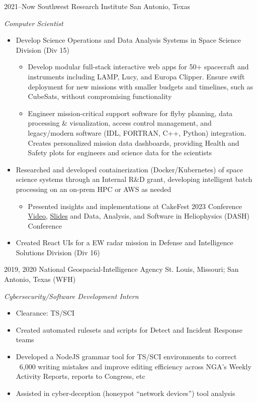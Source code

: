 \documentclass[]{friggeri-cv} %
\begin{document}
\begin{entrylist}

\entry
{2021--Now}
{Southwest Research Institute}
{San Antonio, Texas}
{\emph{Computer Scientist}
	\begin{itemize}
		\item Develop Science Operations and Data Analysis Systems in Space Science Division (Div 15)
		\begin{itemize}
			\item Develop modular full-stack interactive web apps for 50+ spacecraft and instruments including LAMP, Lucy, and Europa Clipper. Ensure swift deployment for new missions with smaller budgets and timelines, such as CubeSats, without compromising functionality
			\item Engineer mission-critical support software for flyby planning, data processing \& visualization, access control management, and legacy/modern software (IDL, FORTRAN, C++, Python) integration. Creates personalized mission data dashboards, providing Health and Safety plots for engineers and science data for the scientists
		\end{itemize}
		\item Researched and developed containerization (Docker/Kubernetes) of space science systems through an Internal R\&D grant, developing intelligent batch processing on an on-prem HPC or AWS as needed
		\begin{itemize}
			\item Presented insights and implementations at CakeFest 2023 Conference  \href{https://www.youtube.com/live/4KB92R7UQc8?si=sA3sVMHHHfgKZKgp&t=19699}{Video}, \href{https://umer936.com/cakefest-2023}{Slides} and Data, Analysis, and Software in Heliophysics (DASH) Conference
		\end{itemize}
		\item Created React UIs for a EW radar mission in Defense and Intelligence Solutions Division (Div 16)
	\end{itemize}
}

\vspace{-5pt}

\entry
{2019, 2020}
{National Geospacial-Intelligence Agency}
{St. Louis, Missouri; San Antonio, Texas (WFH)}
{\emph{Cybersecurity/Software Development Intern}
	\begin{itemize}
		\item Clearance: TS/SCI
		\item Created automated rulesets and scripts for Detect and Incident Response teams
		\item Developed a NodeJS grammar tool for TS/SCI environments to correct ~6,000 writing mistakes and improve editing efficiency across NGA's Weekly Activity Reports, reports to Congress, etc
		\item Assisted in cyber-deception (honeypot ``network devices'') tool analysis
	\end{itemize}
}
\vspace{-5pt}
	

\end{entrylist}
\end{document}
